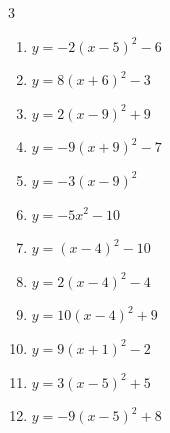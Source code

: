 \begin{multicols}{3}
\begin{enumerate}
  \item $\displaystyle y=-2\left( x-5\right)^{2}-6$

        \phantom{$\displaystyle 頂点\left( 5 , -6 \right)$}

  \item $\displaystyle y=8\left( x+6\right)^{2}-3$

        \phantom{$\displaystyle 頂点\left( -6 , -3 \right)$}

  \item $\displaystyle y=2\left( x-9\right)^{2}+9$

        \phantom{$\displaystyle 頂点\left( 9 , 9 \right)$}

  \item $\displaystyle y=-9\left( x+9\right)^{2}-7$

        \phantom{$\displaystyle 頂点\left( -9 , -7 \right)$}

  \item $\displaystyle y=-3\left( x-9\right)^{2}$

        \phantom{$\displaystyle 頂点\left( 9 , 0 \right)$}

  \item $\displaystyle y=-5x^{2}-10$

        \phantom{$\displaystyle 頂点\left( 0 , -10 \right)$}

  \item $\displaystyle y=\left( x-4\right)^{2}-10$

        \phantom{$\displaystyle 頂点\left( 4 , -10 \right)$}

  \item $\displaystyle y=2\left( x-4\right)^{2}-4$

        \phantom{$\displaystyle 頂点\left( 4 , -4 \right)$}

  \item $\displaystyle y=10\left( x-4\right)^{2}+9$

        \phantom{$\displaystyle 頂点\left( 4 , 9 \right)$}

  \item $\displaystyle y=9\left( x+1\right)^{2}-2$

        \phantom{$\displaystyle 頂点\left( -1 , -2 \right)$}

  \item $\displaystyle y=3\left( x-5\right)^{2}+5$

        \phantom{$\displaystyle 頂点\left( 5 , 5 \right)$}

  \item $\displaystyle y=-9\left( x-5\right)^{2}+8$


\end{enumerate}
\end{multicols}
